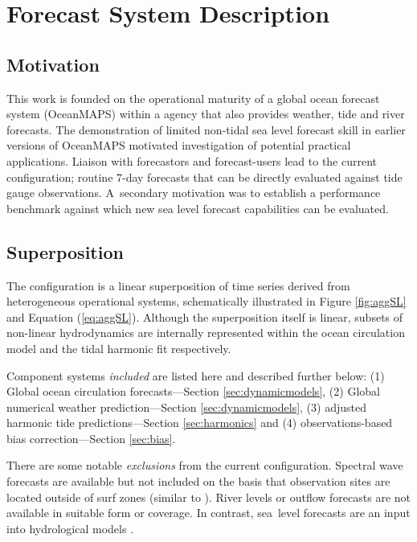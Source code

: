 \section{Forecast System Description}
\vspace{-6pt}
\subsection{Motivation}
This work is founded on the operational maturity of a global ocean forecast system (OceanMAPS) within a agency that also provides weather, tide and river forecasts.
The demonstration of limited non-tidal sea level forecast skill in earlier versions of OceanMAPS \cite{Taylor:2010ud} motivated investigation of potential practical applications. 
Liaison with forecastors and forecast-users lead to the current configuration; routine 7-day forecasts that can be directly evaluated against tide gauge observations.
A~secondary motivation was to establish a performance benchmark against which new sea level forecast capabilities can be evaluated. 

\subsection{Superposition}
\label{sec:concept}
The configuration is a linear superposition of time series derived from heterogeneous operational systems, schematically illustrated in Figure \ref{fig:aggSL} and Equation (\ref{eq:aggSL}).  
Although the superposition itself is linear, subsets of non-linear hydrodynamics are internally represented within the ocean circulation model  and the tidal harmonic fit respectively.

Component systems \textit{included} are listed here and described further below:
(1) Global ocean circulation forecasts---Section \ref{sec:dynamicmodels}, 
(2) Global numerical weather prediction---Section \ref{sec:dynamicmodels}, 
(3) adjusted harmonic tide predictions---Section \ref{sec:harmonics} and 
(4) observations-based bias correction---Section \ref{sec:bias}.

There are some notable \textit{exclusions} from the current configuration.
Spectral wave forecasts are available but not included on the basis that observation sites are located outside of surf zones (similar to  \cite{Tilburg:2004cg}).
River levels or outflow forecasts are not available in suitable form or coverage. In contrast, sea~level forecasts are an input into hydrological models \cite{Taylor:2011ud}.  

